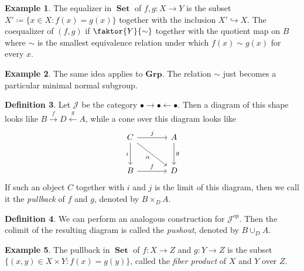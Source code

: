 \documentclass[10pt,letterpaper,cm]{nupset}
\theoremstyle{definition}
\newtheorem{definition}{Definition}
\newtheorem{exmp}[definition]{Example}
\theoremstyle{theorem}
\theoremstyle{remark}
\newcommand{\1}{\mathbf{1}}
\renewcommand{\j}{\mathscr{J}}
\newcommand{\0}{\vec 0}
\DeclareMathOperator{\set}{\mathbf{Set}}
\begin{document}
\begin{exmp}
The equalizer in $\set$ of $f, g: X \to Y$ is the subset $X'\coloneqq \{x \in X : f(x) = g(x)\}$ together with the inclusion $X' \hookrightarrow X$. The coequalizer of $(f, g)$ if $\faktor{Y}{\sim}$ together with the quotient map on $B$ where $\sim$ is the smallest equivalence relation under which $f(x) \sim g(x)$ for every $x$.
\end{exmp}

\begin{exmp}
The same idea applies to $\mathbf{Grp}$. The relation $\sim$ just becomes a particular minimal normal subgroup.
\end{exmp}

\begin{definition}
Let $\j$ be the category $\bullet \rightarrow \bullet \leftarrow \bullet$. Then a diagram of this shape looks like $B \overset{f}{\longrightarrow} D \overset{g}{\longleftarrow} A$, while a cone over this diagram looks like 
\[
\begin{tikzcd}[row sep=large, column sep=large]
C \arrow[to=Z, "i ", swap] \arrow[to=2-2, dr, "\alpha", swap]
& A \arrow[to=2-2, "g "] \\
|[alias=Z]| B  \arrow[to=2-2, "f"] 
& D
\arrow[from=ul, to=1-2, "j "]
\end{tikzcd}
\]
If such an object $C$ together with $i$ and $j$ is the limit of this diagram, then we call it the \textit{pullback} of $f$ and $g$, denoted by $B \times_{D} A$.
\end{definition}

\begin{definition}
We can perform an analogous construction for $\j^{op}$. Then the colimit of the resulting diagram is called the \textit{pushout}, denoted by $B \cup_{D} A$.
\end{definition}

\begin{exmp}
The pullback in $\set$ of $f: X \to Z$ and $g: Y \to Z$ is the subset $\{(x,y) \in X \times Y : f(x) = g(y)\}$, called the \textit{fiber product} of $X$ and $Y$ over $Z$.
\end{exmp}
\end{document}
